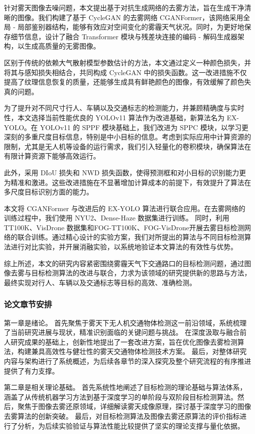 针对雾天图像去噪问题，本文提出基于对抗生成网络的去雾方法，旨在生成干净清晰的图像。我们构建了基于 CycleGAN \cite{cgan}的去雾网络 CGANFormer，该网络采用全局 - 局部鉴别器结构，能够有效应对空间变化的雾霾天气状况。同时，为更好地保存细节信息，设计了融合 Transformer 模块与残差块连接的编码 - 解码生成器架构，以生成高质量的无雾图像。

区别于传统的依赖大气散射模型参数估计的方法，本文通过定义一种颜色损失，并将其与感知损失相结合，共同构成 CycleGAN 中的损失函数。这一改进措施不仅提高了纹理信息恢复的质量，还能够生成具有鲜艳颜色的图像，有效缓解了颜色失真的问题。

为了提升对不同尺寸行人、车辆以及交通标志的检测能力，并兼顾精确度与实时性，本文选择当前性能优良的 YOLOv11 算法作为改进基础，新算法名为 EX-YOLO。在 YOLOv11 的 SPPF 模块基础上，我们改进为 SPPC 模块，以学习更深刻的多重尺度目标信息，特别是中小目标的信息。考虑到实际应用中计算资源的限制，尤其是无人机等设备的运行需求，我们引入轻量化的卷积模块，确保算法在有限计算资源下能够高效运行。

此外，采用 DIoU 损失和 NWD 损失函数\cite{nwd}，使得预测框和对小目标的识别能力更为精准和激进。这些改进措施在不显著增加计算成本的前提下，有效提升了算法在多尺度目标识别方面的能力。

本文将 CGANFormer 与改进后的 EX-YOLO 算法进行联合应用。在去雾网络的训练过程中，我们使用 NYU2\cite{nyu2}、Dense-Haze\cite{NTIRE_Dehazing_2019} 数据集进行训练。
同时，利用 TT100K\cite{tt100k}、VisDrone\cite{vd} 数据集和FOG-TT100K、FOG-VisDrone开展去雾目标检测网络的联合训练。通过精心设计的实验方案，我们对所提出的算法与不同目标检测算法进行对比实验，并开展消融实验，以系统地验证本文算法的有效性与优势。

综上所述，本文的研究内容紧密围绕雾霾天气下交通路口的目标检测问题，通过图像去雾与目标检测算法的改进与联合，力求为该领域的研究提供新的思路与方法，最终实现对行人、车辆以及交通标志等目标的高效、准确检测。

\subsubsection{论文章节安排}

第一章是绪论。
首先聚焦于雾天下无人机交通物体检测这一前沿领域，系统梳理了当前研究进展与现状，精准识别面临的关键问题与挑战。
在深度汲取与融合前人研究成果的基础上，创新性地提出了一套改进方案，旨在优化图像去雾检测算法，构建兼具高效性与健壮性的雾天交通物体检测技术方案。
最后，对整体研究内容与架构进行了系统概述，为后续各章节的深入探究及整个研究流程的有序推进提供了有力支撑。

第二章是相关理论基础。
首先系统性地阐述了目标检测的理论基础与算法体系，涵盖了从传统机器学习方法到基于深度学习的单阶段与双阶段目标检测算法。然后，聚焦于图像去雾还原领域，详细解读雾天成像原理，探讨基于深度学习的图像去雾算法的创新突破。
最后，对目标检测算法及图像去雾还原算法的评价指标进行了分析，为后续实验验证与算法性能比较提供了坚实的理论支撑与量化依据。

